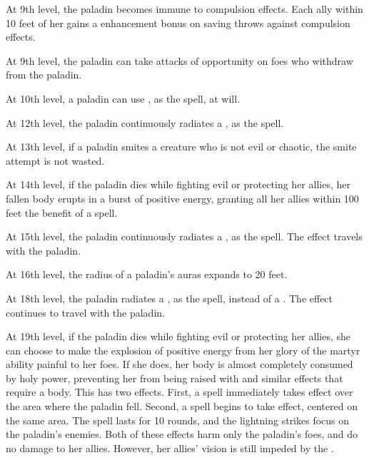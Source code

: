  At 9th level, the paladin becomes immune to compulsion effects. Each ally within 10 feet of her gains a  enhancement bonus on saving throws against compulsion effects.

 At 9th level, the paladin can take attacks of opportunity on foes who withdraw from the paladin.

\label{Pal:Detect Chaos} At 10th level, a paladin can use , as the spell, at will.

 At 12th level, the paladin continuously radiates a , as the spell.

 At 13th level, if a paladin smites a creature who is not evil or chaotic, the smite attempt is not wasted.

 At 14th level, if the paladin dies while fighting evil or protecting her allies, her fallen body erupts in a burst of positive energy, granting all her allies within 100 feet the benefit of a  spell.

 At 15th level, the paladin continuously radiates a , as the spell. The effect travels with the paladin.

 At 16th level, the radius of a paladin's auras expands to 20 feet.

 At 18th level, the paladin radiates a , as the spell, instead of a . The effect continues to travel with the paladin.

 At 19th level, if the paladin dies while fighting evil or protecting her allies, she can choose to make the explosion of positive energy from her glory of the martyr ability painful to her foes. If she does, her body is almost completely consumed by holy power, preventing her from being raised with  and similar effects that require a body. This has two effects. First, a  spell immediately takes effect over the area where the paladin fell. Second, a  spell begins to take effect, centered on the same area. The spell lasts for 10 rounds, and the lightning strikes focus on the paladin's enemies. Both of these effects harm only the paladin's foes, and do no damage to her allies. However, her allies' vision is still impeded by the .

